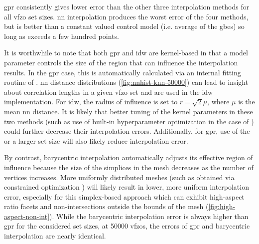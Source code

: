 \documentclass[final,twocolumn,12pt]{elsarticle}
\begin{document}
\Gls{gpr} consistently gives lower error than the other three interpolation methods for all \gls{vfzo} set sizes. 
\Gls{nn} interpolation produces the worst error of the four methods, but is better than a constant valued control model (i.e. average of the \inpt{} \glspl{gbe}) so long as  exceeds a few hundred \inpt{} points.

It is worthwhile to note that both \gls{gpr} and \gls{idw} are kernel-based in that a model parameter controls the size of the region that can influence the interpolation results. In the \gls{gpr} case, this is automatically calculated via an internal fitting routine of . \gls{nn} distance distributions (\cref{fig:nnhist-knn-50000}) can lead to insight about correlation lengths in a given \gls{vfzo} set and are used in the \gls{idw} implementation. For \gls{idw}, the radius of influence is set to $r=\sqrt{2} \mu$, where $\mu$ is the mean \gls{nn} distance. It is likely that better tuning of the kernel parameters in these two methods (such as use of built-in hyperparameter optimization in the case of ) could further decrease their interpolation errors. Additionally, for \gls{gpr}, use of the   or a larger  set size will also likely reduce interpolation error.

By contrast, barycentric interpolation automatically adjusts its effective region of influence because the size of the simplices in the mesh decreases as the number of vertices increases. More uniformly distributed meshes (such as obtained via constrained optimization \cite{dolanBenchmarkingOptimizationSoftware2004,ConstrainedElectrostaticNonlinear2020}) will likely result in lower, more uniform interpolation error, especially for this simplex-based approach which can exhibit high-aspect ratio facets and non-intersections outside the bounds of the mesh (\cref{fig:high-aspect-non-int}). While the barycentric interpolation error is always higher than \gls{gpr} for the considered set sizes, at \num{50000} \glspl{vfzo}, the errors of \gls{gpr} and barycentric interpolation are nearly identical. %
\end{document}
